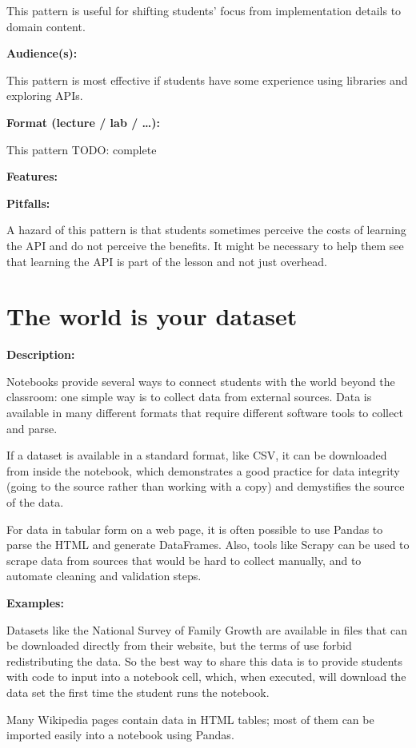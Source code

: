 \documentclass[]{book}
\begin{document}
This pattern is useful for shifting students' focus from implementation
details to domain content.

\textbf{Audience(s):}

This pattern is most effective if students have some experience using
libraries and exploring APIs.

\textbf{Format (lecture / lab / \ldots{}):}

This pattern TODO: complete

\textbf{Features:}

\textbf{Pitfalls:}

A hazard of this pattern is that students sometimes perceive the costs
of learning the API and do not perceive the benefits. It might be
necessary to help them see that learning the API is part of the lesson
and not just overhead.

\section{The world is your dataset}\label{the-world-is-your-dataset}

\textbf{Description:}

Notebooks provide several ways to connect students with the world beyond
the classroom: one simple way is to collect data from external sources.
Data is available in many different formats that require different
software tools to collect and parse.

If a dataset is available in a standard format, like CSV, it can be
downloaded from inside the notebook, which demonstrates a good practice
for data integrity (going to the source rather than working with a copy)
and demystifies the source of the data.

For data in tabular form on a web page, it is often possible to use
Pandas to parse the HTML and generate DataFrames. Also, tools like
Scrapy can be used to scrape data from sources that would be hard to
collect manually, and to automate cleaning and validation steps.

\textbf{Examples:}

Datasets like the National Survey of Family Growth are available in
files that can be downloaded directly from their website, but the terms
of use forbid redistributing the data. So the best way to share this
data is to provide students with code to input into a notebook cell,
which, when executed, will download the data set the first time the
student runs the notebook.

Many Wikipedia pages contain data in HTML tables; most of them can be
imported easily into a notebook using Pandas.
\end{document}
